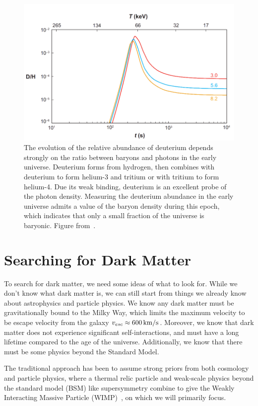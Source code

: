 \begin{figure}[htbp]
\centering
    \includegraphics[width=\textwidth]{figures/dm/bbn_eta}
    \caption{The evolution of the relative abundance of deuterium depends strongly on the ratio between baryons and photons in the early universe. Deuterium forms from hydrogen, then combines with deuterium to form helium-3 and tritium or with tritium to form helium-4. Due its weak binding, deuterium is an excellent probe of the photon density. Measuring the deuterium abundance in the early universe admits a value of the baryon density during this epoch, which indicates that only a small fraction of the universe is baryonic. Figure from~\cite{Steigman:2007xt}.}\label{fig:bbn}
\end{figure}

\section{Searching for Dark Matter}

To search for dark matter, we need some ideas of what to look for. While we don't know what dark matter is, we can still start from things we already know about astrophysics and particle physics. We know any dark matter must be gravitationally bound to the Milky Way, which limits the maximum velocity to be escape velocity from the galaxy $v_{esc} \approx 600\,\mathrm{km/s}$. Moreover, we know that dark matter does not experience significant self-interactions, and must have a long lifetime compared to the age of the universe. Additionally, we know that there must be some physics beyond the Standard Model.

The traditional approach has been to assume strong priors from both cosmology and particle physics, where a thermal relic particle and weak-scale physics beyond the standard model (BSM) like supersymmetry combine to give the Weakly Interacting Massive Particle (WIMP)~\cite{Jungman:1995df}, on which we will primarily focus.

